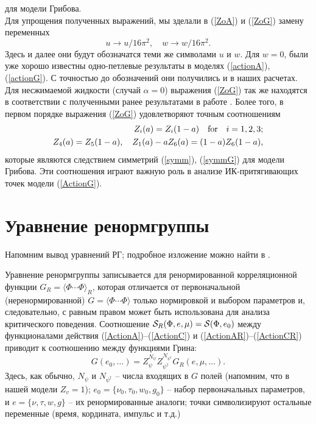 \documentclass[a4paper,10pt]{article}
\def\S{{\cal S}}
\def\S{{\cal S}}
\begin{document}
для модели Грибова.\\
Для упрощения полученных выражений, мы зделали в (\ref{ZoA})
и  (\ref{ZoG}) замену переменных  \[ u \to u/16\pi^2, \quad w \to w/16\pi^2. \] Здесь и далее
они будут  обозначатся теми же символами  $u$ и $w$.
Для $w=0$, были уже хорошо известны  одно-петлевые результаты в моделях (\ref{actionA}),
(\ref{actionG}). С точностью до обозначений они получились и в наших расчетах. Для несжимаемой жидкости (случай $\alpha=0$) выражения (\ref{ZoG}) так же находятся в соответствии
с полученными ранее результатами в работе \cite{AIK}. Более того, в первом порядке выражения (\ref{ZoG}) удовлетворяют точным соотношениям
\begin{eqnarray}
Z_{i} (a) = Z_{i} (1-a) \quad {\rm for} \quad i=1,2,3; \nonumber \\
Z_{4} (a) = Z_{5} (1-a), \quad
Z_{1} (a) -a Z_{6}(a) = (1-a) Z_{6}(1-a),
\label{GSymm}
\end{eqnarray}
которые являются следствием симметрий (\ref{symm}), (\ref{symmG}) для модели Грибова. Эти соотношения играют важную роль в анализе ИК-притягивающих точек модели
(\ref{ActionG}).

\section{Уравнение ренормгруппы} \label{sec:RGE}

Напомним вывод уравнений РГ; подробное изложение можно найти в \cite{Zinn,Book3}.

Уравнение ренормгруппы записывается для ренормированной
корреляционной функции $G_{R} =\langle \Phi\cdots\Phi\rangle_{R}$,
которая отличается от первоначальной (неренормированной) $G
=\langle \Phi\cdots\Phi\rangle$ только нормировкой и выбором
параметров и, следовательно, с равным правом может быть
использована для анализа критического поведения.
Соотношение $\S_{R} (\Phi,e,\mu) =
\S(\Phi,e_{0})$ между функционалами действия (\ref{ActionA})--(\ref{ActionC})  и
(\ref{ActionAR})--(\ref{ActionCR}) приводит к соотношению между функциями Грина:
\begin{equation}
G(e_{0},\dots) = Z_{\psi}^{N_{\psi}}
Z_{\psi^{\dagger}}^{N_{\psi^{\dagger}}} G_{R}(e,\mu,\dots).
\label{multi}
\end{equation}
Здесь, как обычно, $N_{\psi}$ и $N_{\psi^{\dagger}}$ -- числа
входящих в $G$ полей (напомним, что в нашей модели
$Z_{v}=1$);  $e_{0}=\{\nu_{0}, \tau_{0}, w_{0}, g_{0} \}$ -- набор
первоначальных параметров, и $e=\{ \nu, \tau, w, g \}$ -- их
ренормированные аналоги; точки символизируют остальные переменные
(время, кордината, импульс и т.д.)
\end{document}
